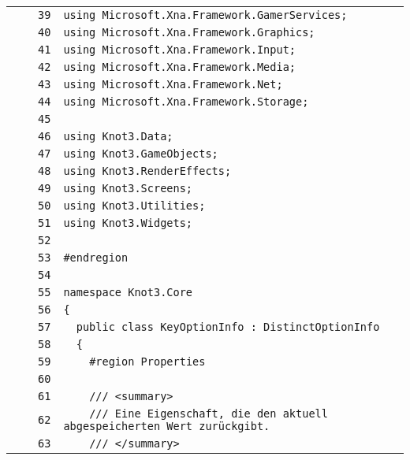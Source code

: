 \documentclass[a4paper,10pt]{article}
\begin{document}
\begin{longtable}[l]{lrrl}
\cellcolor{gray} &  & \verb~39~ & \verb~using Microsoft.Xna.Framework.GamerServices;~\\
\cellcolor{gray} &  & \verb~40~ & \verb~using Microsoft.Xna.Framework.Graphics;~\\
\cellcolor{gray} &  & \verb~41~ & \verb~using Microsoft.Xna.Framework.Input;~\\
\cellcolor{gray} &  & \verb~42~ & \verb~using Microsoft.Xna.Framework.Media;~\\
\cellcolor{gray} &  & \verb~43~ & \verb~using Microsoft.Xna.Framework.Net;~\\
\cellcolor{gray} &  & \verb~44~ & \verb~using Microsoft.Xna.Framework.Storage;~\\
\cellcolor{gray} &  & \verb~45~ & \verb~~\\
\cellcolor{gray} &  & \verb~46~ & \verb~using Knot3.Data;~\\
\cellcolor{gray} &  & \verb~47~ & \verb~using Knot3.GameObjects;~\\
\cellcolor{gray} &  & \verb~48~ & \verb~using Knot3.RenderEffects;~\\
\cellcolor{gray} &  & \verb~49~ & \verb~using Knot3.Screens;~\\
\cellcolor{gray} &  & \verb~50~ & \verb~using Knot3.Utilities;~\\
\cellcolor{gray} &  & \verb~51~ & \verb~using Knot3.Widgets;~\\
\cellcolor{gray} &  & \verb~52~ & \verb~~\\
\cellcolor{gray} &  & \verb~53~ & \verb~#endregion~\\
\cellcolor{gray} &  & \verb~54~ & \verb~~\\
\cellcolor{gray} &  & \verb~55~ & \verb~namespace Knot3.Core~\\
\cellcolor{gray} &  & \verb~56~ & \verb~{~\\
\cellcolor{gray} &  & \verb~57~ & \verb~  public class KeyOptionInfo : DistinctOptionInfo~\\
\cellcolor{gray} &  & \verb~58~ & \verb~  {~\\
\cellcolor{gray} &  & \verb~59~ & \verb~    #region Properties~\\
\cellcolor{gray} &  & \verb~60~ & \verb~~\\
\cellcolor{gray} &  & \verb~61~ & \verb~    /// <summary>~\\
\cellcolor{gray} &  & \verb~62~ & \verb~    /// Eine Eigenschaft, die den aktuell abgespeicherten Wert zurückgibt.~\\
\cellcolor{gray} &  & \verb~63~ & \verb~    /// </summary>~\\

\end{longtable}
\end{document}
